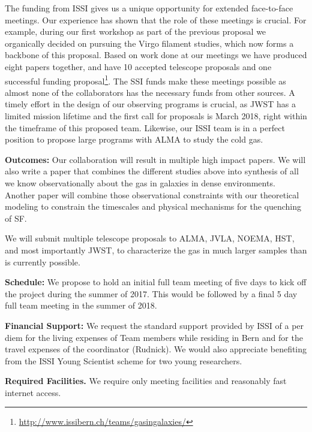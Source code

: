 \documentclass[11pt]{article}
\begin{document}
The funding from ISSI gives us a unique opportunity for extended face-to-face meetings.  Our experience has shown that the role of these meetings is crucial.  For example, during our first workshop as part of the previous proposal we organically decided on pursuing the Virgo filament studies, which now forms a backbone of this proposal.  Based on work done at our meetings we have produced eight papers together, and have 10 accepted telescope proposals and one successful funding proposal\footnote{\url{http://www.issibern.ch/teams/gasingalaxies/}}.  The SSI
funds make these meetings possible as almost none of the collaborators has the
necessary funds from other sources.
A timely effort in the design of our observing programs is crucial, as JWST has a limited mission lifetime and the first call for proposals is March 2018, right within the timeframe of this proposed team. Likewise, our ISSI team
is in a perfect position to propose large programs with ALMA to study the
cold gas.  

\textbf{Outcomes:} Our collaboration will result in multiple high
impact papers.  We will also write a
paper that combines the different studies above into synthesis of all we know observationally about the gas in galaxies in
dense environments.  Another paper will combine those observational
constraints with our theoretical modeling to constrain the timescales
and physical mechanisms for the quenching of SF.

We will submit multiple telescope proposals to ALMA, JVLA, NOEMA, HST, and most importantly JWST, 
 to characterize the gas in much larger samples than is currently possible.

\textbf{Schedule:} We propose to hold an initial full team meeting of five days to kick off the project during the summer of 2017. This would be followed by a final 5 day full team meeting in the summer of 2018. 

\textbf{Financial Support:} We request the standard support provided
by ISSI of a per diem for the living expenses of Team members while
residing in Bern and for the travel expenses of the coordinator
(Rudnick). We would also appreciate benefiting from the ISSI Young
Scientist scheme for two young researchers.  

\textbf{Required Facilities.}  We require only meeting facilities and
reasonably fast internet access.
\end{document}
